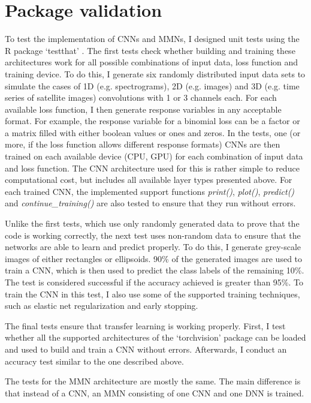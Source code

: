 \documentclass[12pt,twoside]{scrreport}
\newcommand{\pkg}[1]{`#1'}
\newcommand{\fn}[2][]{\textit{#2(}#1\textit{)}}
\begin{document}
\section*{Package validation}
To test the implementation of CNNs and MMNs, I designed unit tests using the R package \pkg{testthat} \citep{wickhamTestthatGetStarted2011}. The first tests check whether building and training these architectures work for all possible combinations of input data, loss function and training device. To do this, I generate six randomly distributed input data sets to simulate the cases of 1D (e.g. spectrograms), 2D (e.g. images) and 3D (e.g. time series of satellite images) convolutions with 1 or 3 channels each. For each available loss function, I then generate response variables in any acceptable format. For example, the response variable for a binomial loss can be a factor or a matrix filled with either boolean values or ones and zeros. In the tests, one (or more, if the loss function allows different response formats) CNNs are then trained on each available device (CPU, GPU) for each combination of input data and loss function. The CNN architecture used for this is rather simple to reduce computational cost, but includes all available layer types presented above. For each trained CNN, the implemented support functions \fn{print}, \fn{plot}, \fn{predict} and \fn{continue\_training} are also tested to ensure that they run without errors.

Unlike the first tests, which use only randomly generated data to prove that the code is working correctly, the next test uses non-random data to ensure that the networks are able to learn and predict properly. To do this, I generate grey-scale images of either rectangles or ellipsoids. 90\% of the generated images are used to train a CNN, which is then used to predict the class labels of the remaining 10\%. The test is considered successful if the accuracy achieved is greater than 95\%. To train the CNN in this test, I also use some of the supported training techniques, such as elastic net regularization and early stopping.

The final tests ensure that transfer learning is working properly. First, I test whether all the supported architectures of the \pkg{torchvision} package can be loaded and used to build and train a CNN without errors. Afterwards, I conduct an accuracy test similar to the one described above.

The tests for the MMN architecture are mostly the same. The main difference is that instead of a CNN, an MMN consisting of one CNN and one DNN is trained.
\end{document}
